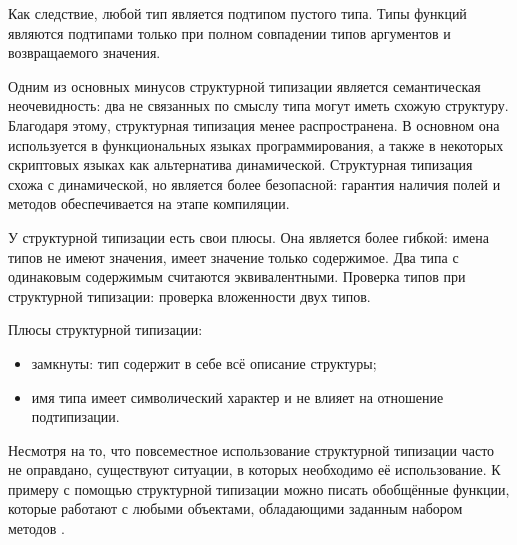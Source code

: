 Как следствие, любой тип является подтипом пустого типа. Типы функций являются подтипами только при полном совпадении типов аргументов и возвращаемого значения.

Одним из основных минусов структурной типизации является семантическая неочевидность: два не связанных по смыслу типа могут иметь схожую структуру. Благодаря этому, структурная типизация менее распространена. В основном она используется в функциональных языках программирования, а также в некоторых скриптовых языках как альтернатива динамической. Структурная типизация схожа с динамической, но является более безопасной: гарантия наличия полей и методов обеспечивается на этапе компиляции.

У структурной типизации есть свои плюсы. Она является более гибкой: имена типов не имеют значения, имеет значение только содержимое. Два типа с одинаковым содержимым считаются эквивалентными. Проверка типов при структурной типизации: проверка вложенности двух типов.

Плюсы структурной типизации:
\begin{itemize}
    \item замкнуты: тип содержит в себе всё описание структуры;
    \item имя типа имеет символический характер и не влияет на отношение подтипизации.
\end{itemize}

Несмотря на то, что повсеместное использование структурной типизации часто не оправдано, существуют ситуации, в которых необходимо её использование. К примеру с помощью структурной типизации можно писать обобщённые функции, которые работают с любыми объектами, обладающими заданным набором методов \cite{JOT:issue_2008_01/article4}.
